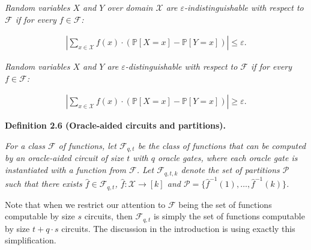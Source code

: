 \documentclass[10pt,a4paper]{article}
\begin{document}
\emph{Random variables $X$ and $Y$ over domain $\mathcal{X}$ are $\varepsilon$-indistinguishable with respect to $\mathcal{F}$ if for every $f\in\mathcal{F}$:}\par


\[\begin{gathered}
\left|\sum_{x\in\mathcal{X}}f(x)\cdot\left(\mathbb{P}[X=x]-\mathbb{P}[Y=x]\right)\right|\leq\varepsilon.
\end{gathered}\]


\emph{Random variables $X$ and $Y$ are $\varepsilon$-distinguishable with respect to $\mathcal{F}$ if for every $f\in\mathcal{F}$:}\par


\[\begin{gathered}
\left|\sum_{x\in\mathcal{X}}f(x)\cdot\left(\mathbb{P}[X=x]-\mathbb{P}[Y=x]\right)\right|\geq\varepsilon.
\end{gathered}\]







\par\medskip\noindent\textbf{
\textbf{Definition 2.6}\textbf{ }(Oracle-aided circuits and partitions)\textbf{.}
}\par



\emph{For a class $\mathcal{F}$ of functions, let $\mathcal{F}_{q,t}$ be the class of functions that can be computed by an oracle-aided circuit of size $t$ with $q$ oracle gates, where each oracle gate is instantiated with a function from $\mathcal{F}$. Let $\mathcal{F}_{q,t,k}$ denote the set of partitions $\mathcal{P}$ such that there exists $\hat{f}\in\mathcal{F}_{q,t}$, $\hat{f}:\mathcal{X}\rightarrow[k]$ and $\mathcal{P}=\{\hat{f}^{-1}(1),\dots,\hat{f}^{-1}(k)\}$.}\par






Note that when we restrict our attention to $\mathcal{F}$ being the set of functions computable by size $s$ circuits, then $\mathcal{F}_{q,t}$ is simply the set of functions computable by size $t+q\cdot s$ circuits. The discussion in the introduction is using exactly this simplification.\par
\end{document}
